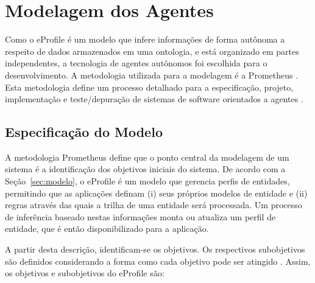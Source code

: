\section{Modelagem dos Agentes}
\label{sec:modelagem}


Como o eProfile é um modelo que infere informações de forma autônoma a respeito de dados armazenados em uma ontologia, e está organizado em partes independentes, a tecnologia de agentes autônomos foi escolhida para o desenvolvimento. A metodologia utilizada para a modelagem é a Prometheus \cite{prometheus}. Esta metodologia define um processo detalhado para a especificação, projeto, implementação e teste/depuração de sistemas de software orientados a agentes \cite{prometheus-book}.


\subsection{Especificação do Modelo}
\label{sec:especificacao}


A metodologia Prometheus define que o ponto central da modelagem de um sistema é a identificação dos objetivos iniciais do sistema. De acordo com a Seção~\ref{sec:modelo}, o eProfile é um modelo que gerencia perfis de entidades, permitindo que as aplicações definam (i) seus próprios modelos de entidade e (ii) regras através das quais a trilha de uma entidade será processada. Um processo de inferência baseado nestas informações monta ou atualiza um perfil de entidade, que é então disponibilizado para a aplicação.

A partir desta descrição, identificam-se os objetivos. Os respectivos subobjetivos são definidos considerando a forma como cada objetivo pode ser atingido \cite{prometheus-book}. Assim, os objetivos e subobjetivos do eProfile são:

